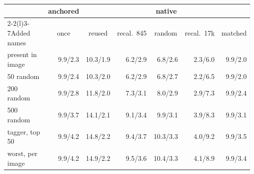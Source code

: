 \setlength{\tabcolsep}{4pt}\begin{tabular}{@{}lrrrrrr@{}}
\toprule
& \multicolumn{1}{c}{anchored} & \multicolumn{5}{c}{native} \\ \cmidrule(lr){2-2}\cmidrule(l){3-7}Added names & \multicolumn{1}{c}{once} & \multicolumn{1}{c}{reused} & \multicolumn{1}{c}{recal.\ 845} & \multicolumn{1}{c}{random} & \multicolumn{1}{c}{recal.\ 17k} & \multicolumn{1}{c}{matched} \\
\midrule
present in image & 9.9/2.3 & 10.3/1.9 & 6.2/2.9 & 6.8/2.6 & 2.3/6.0 & 9.9/2.0 \\
50 random & 9.9/2.4 & 10.3/2.0 & 6.2/2.9 & 6.8/2.7 & 2.2/6.5 & 9.9/2.0 \\
200 random & 9.9/2.8 & 11.8/2.0 & 7.3/3.1 & 8.0/2.9 & 2.9/7.3 & 9.9/2.4 \\
500 random & 9.9/3.7 & 14.1/2.1 & 9.1/3.4 & 9.9/3.1 & 3.9/8.3 & 9.9/3.1 \\
tagger, top 50 & 9.9/4.2 & 14.8/2.2 & 9.4/3.7 & 10.3/3.3 & 4.0/9.2 & 9.9/3.5 \\
worst, per image & 9.9/4.2 & 14.9/2.2 & 9.5/3.6 & 10.4/3.3 & 4.1/8.9 & 9.9/3.4 \\
\bottomrule
\end{tabular}
